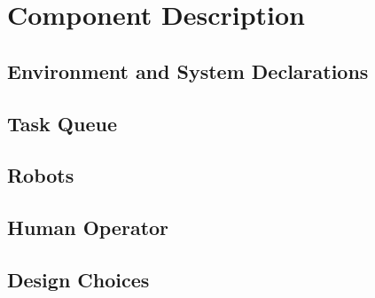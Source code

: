 \section{Component Description}

\subsection{Environment and System Declarations}

\subsection{Task Queue}

\subsection{Robots}

\subsection{Human Operator}	

\subsection{Design Choices}